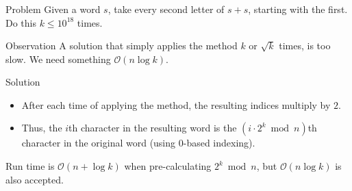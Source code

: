 \begin{frame}
    \frametitle{\problemtitle}
    \begin{block}{Problem}
        Given a word $s$, take every second letter of $s+s$, starting with the first.
        Do this $k \leq 10^{18}$ times.
    \end{block}
    \pause
    \begin{block}{Observation}
        A solution that simply applies the method $k$ or $\sqrt k$ times, is too slow.
        We need something $\mathcal O(n \log k)$.
    \end{block}
    \pause
    \begin{block}{Solution}
        \begin{itemize}
            \item After each time of applying the method, the resulting indices multiply by $2$.
            \item Thus, the $i$th character in the resulting word is the $(i \cdot 2^k \bmod n)$th character in the original word (using $0$-based indexing).
        \end{itemize}
        Run time is $\mathcal O(n + \log k)$ when pre-calculating $2^k \bmod n$, but $\mathcal O(n \log k)$ is also accepted.
    \end{block}
    \pause
    \solvestats
\end{frame}
